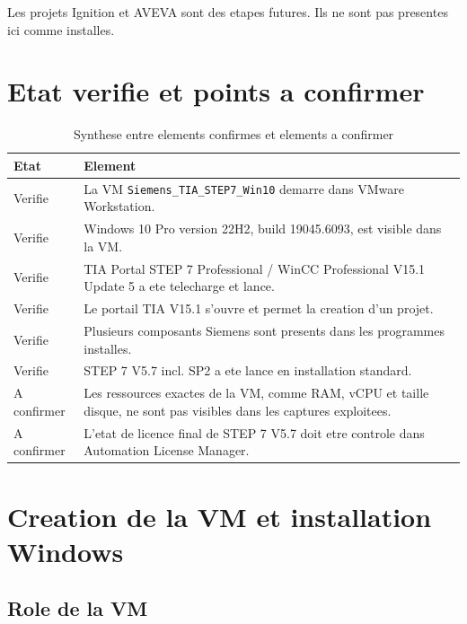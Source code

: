 \documentclass[11pt,a4paper]{article}
\begin{document}
Les projets Ignition et AVEVA sont des etapes futures. Ils ne sont pas
presentes ici comme installes.

\section{Etat verifie et points a confirmer}

\begin{table}[H]
\centering
\begin{tabularx}{\textwidth}{lX}
\toprule
\textbf{Etat} & \textbf{Element} \\
\midrule
Verifie & La VM \texttt{Siemens\_TIA\_STEP7\_Win10} demarre dans VMware Workstation. \\
Verifie & Windows 10 Pro version 22H2, build 19045.6093, est visible dans la VM. \\
Verifie & TIA Portal STEP 7 Professional / WinCC Professional V15.1 Update 5 a ete telecharge et lance. \\
Verifie & Le portail TIA V15.1 s'ouvre et permet la creation d'un projet. \\
Verifie & Plusieurs composants Siemens sont presents dans les programmes installes. \\
Verifie & STEP 7 V5.7 incl. SP2 a ete lance en installation standard. \\
A confirmer & Les ressources exactes de la VM, comme RAM, vCPU et taille disque, ne sont pas visibles dans les captures exploitees. \\
A confirmer & L'etat de licence final de STEP 7 V5.7 doit etre controle dans Automation License Manager. \\
\bottomrule
\end{tabularx}
\caption{Synthese entre elements confirmes et elements a confirmer}
\end{table}

\section{Creation de la VM et installation Windows}

\subsection{Role de la VM}
\end{document}
